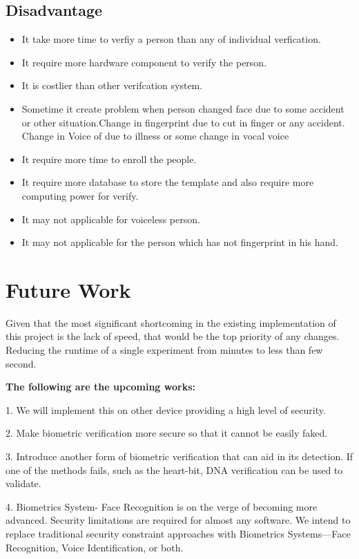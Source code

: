 \documentclass[conference]{IEEEtran}
\begin{document}
\subsection{Disadvantage}
\begin{itemize}
	\item It take more time to verfiy a person than any of individual verfication.
	\item It require more hardware component to verify the person.
	\item It is costlier than other verifcation system.
	\item Sometime it create problem when person changed face due to some accident or other
	situation.Change in fingerprint due to cut in finger or any accident. Change in Voice of due to
	illness or some change in vocal voice
	\item It require more time to enroll the people.
	\item It require more database to store the template and also require more computing power for verify.
	\item It may not applicable for voiceless person.
	\item It may not applicable for the person which has not fingerprint in his hand.
\end{itemize}
\section{Future Work}
Given that the most significant shortcoming in the existing implementation of this project is the lack of speed, that would be the top priority of any changes. Reducing the runtime of a single experiment from  minutes to less than few second.

{\bf The following are the upcoming works:}

1. We will implement this on other device providing a high level of security.

2. Make biometric verification more secure so that it cannot be easily faked.

3. Introduce another form of biometric verification that can aid in its detection. If one of the methods fails, such as the heart-bit, DNA verification can be used to validate.


4. Biometrics System- Face Recognition is on the verge of becoming more advanced. Security limitations are required for almost any software. We intend to replace traditional security constraint approaches with Biometrics Systems—Face Recognition, Voice Identification, or both.
\end{document}
